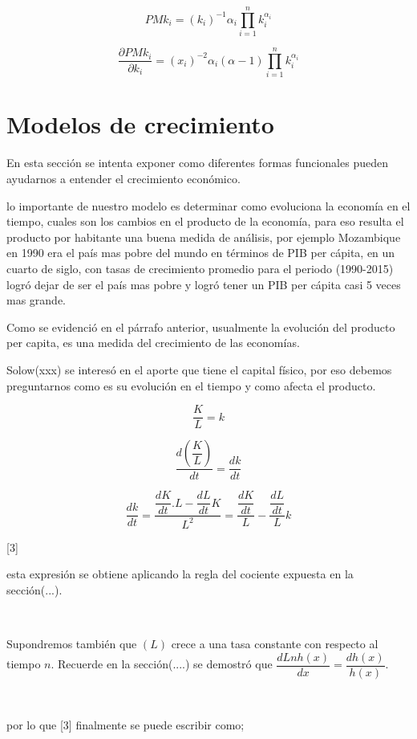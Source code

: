 \documentclass[12pt]{article}
\begin{document}
$$PMk_i=(k_i)^{-1}\alpha_i\prod_{i=1}^nk_i^{\alpha_i}$$




$$\frac{\partial PMk_i}{\partial k_i}=(x_i)^{-2}\alpha_i(\alpha - 1)\prod_{i=1}^nk_i^{\alpha_i}$$

\section{Modelos de crecimiento}
En esta sección se intenta exponer como diferentes formas funcionales pueden ayudarnos a entender el crecimiento económico.

lo importante de nuestro modelo es determinar como evoluciona la economía en el tiempo, cuales son los cambios en el producto de la economía, para eso resulta el producto por habitante una buena medida de análisis, por ejemplo Mozambique en 1990 era el país mas pobre del mundo en términos de PIB per cápita, en un cuarto de siglo, con tasas de crecimiento promedio para el periodo (1990-2015) logró dejar de ser el país mas pobre y logró tener un PIB per cápita casi 5 veces mas grande.





Como se evidenció en el párrafo anterior, usualmente la evolución del producto per capita, es una medida del crecimiento de las economías.

Solow(xxx) se interesó en el aporte que tiene el capital físico, por eso debemos preguntarnos como es su evolución en el tiempo y como afecta el producto.



$$\dfrac{K}{L} =k $$

$$ \dfrac{d(\dfrac{K}{L})}{dt}= \dfrac {dk}{dt}$$


$$ \dfrac{dk}{dt}=\dfrac{\dfrac{dK}{dt}.L-\dfrac{dL}{dt}K}{L^{2}} = \dfrac{\dfrac{dK}{dt}}{L}-\dfrac{\dfrac{dL}{dt}}{L}k$$

[3]

esta expresión se obtiene aplicando la regla del cociente expuesta en la sección(...).





\

Supondremos también que $(L)$ crece a una tasa constante con respecto al tiempo $n$.  Recuerde en la sección(....) se demostró que $\dfrac{d Ln h(x)}{dx}=\dfrac{dh(x)}{h(x)}$.

\

por lo que [3] finalmente se puede escribir como; 
\end{document}
